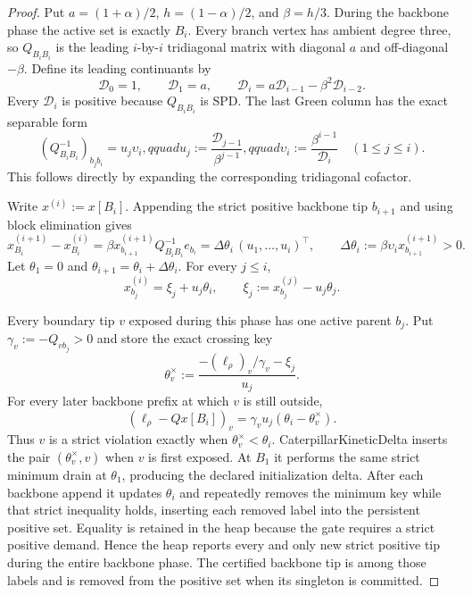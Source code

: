 \begin{proof}
Put $a=(1+\alpha)/2$, $h=(1-\alpha)/2$, and
$\beta=h/3$.  During the backbone phase the active set is exactly $B_i$.
Every branch vertex has ambient degree three, so $Q_{B_iB_i}$ is the leading
$i$-by-$i$ tridiagonal matrix with diagonal $a$ and off-diagonal $-\beta$.
Define its leading continuants by
\begin{equation*}
 \mathcal D_0=1,\qquad \mathcal D_1=a,\qquad
 \mathcal D_i=a\mathcal D_{i-1}-\beta^2\mathcal D_{i-2}.
\end{equation*}
Every $\mathcal D_i$ is positive because $Q_{B_iB_i}$ is SPD.  The last
Green column has the exact separable form
\begin{equation}
 (Q_{B_iB_i}^{-1})_{b_jb_i}=u_j\upsilon_i,qquad
 u_j:=\frac{\mathcal D_{j-1}}{\beta^{j-1}},qquad
 \upsilon_i:=\frac{\beta^{i-1}}{\mathcal D_i}
 \quad(1\leq j\leq i).
 \label{eq:branch-prefix-green-factorization}
\end{equation}
This follows directly by expanding the corresponding tridiagonal cofactor.

Write $x^{(i)}:=x[B_i]$.  Appending the strict positive backbone tip
$b_{i+1}$ and using block elimination gives
\begin{equation}
 x^{(i+1)}_{B_i}-x^{(i)}_{B_i}
 =\beta x^{(i+1)}_{b_{i+1}}Q_{B_iB_i}^{-1}e_{b_i}
 =\Delta\theta_i\,(u_1,\ldots,u_i)^\top,
 \qquad
 \Delta\theta_i:=\beta\upsilon_i x^{(i+1)}_{b_{i+1}}>0.
 \label{eq:branch-prefix-one-parameter-update}
\end{equation}
Let $\theta_1=0$ and
$\theta_{i+1}=\theta_i+\Delta\theta_i$.  For every $j\leq i$,
\begin{equation}
 x^{(i)}_{b_j}=\xi_j+u_j\theta_i,
 \qquad
 \xi_j:=x^{(j)}_{b_j}-u_j\theta_j.
 \label{eq:branch-prefix-affine-coordinate}
\end{equation}

Every boundary tip $v$ exposed during this phase has one active parent
$b_j$.  Put $\gamma_v:=-Q_{vb_j}>0$ and store the exact crossing key
\begin{equation}
 \theta_v^\times
 :=\frac{-(\ell_\rho)_v/\gamma_v-\xi_j}{u_j}.
 \label{eq:branch-tip-crossing-key}
\end{equation}
For every later backbone prefix at which $v$ is still outside,
\begin{equation}
 (\ell_\rho-Qx[B_i])_v
 =\gamma_vu_j(\theta_i-\theta_v^\times).
 \label{eq:branch-tip-kinetic-demand}
\end{equation}
Thus $v$ is a strict violation exactly when
$\theta_v^\times<\theta_i$.  CaterpillarKineticDelta inserts the pair
$(\theta_v^\times,v)$ when $v$ is first exposed.  At $B_1$ it performs the
same strict minimum drain at $\theta_1$, producing the declared initialization
delta.  After each backbone append it updates $\theta_i$ and repeatedly
removes the minimum key while
that strict inequality holds, inserting each removed label into the
persistent positive set.  Equality is retained in the heap because the gate
requires a strict positive demand.  Hence the heap reports every and only
new strict positive tip during the entire backbone phase.  The certified
backbone tip is among those labels and is removed from the positive set when
its singleton is committed.


\end{proof}
